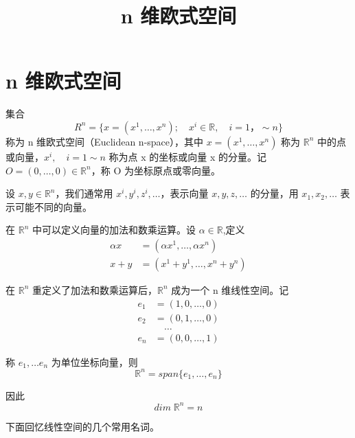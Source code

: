 \documentclass{article}
\title{n 维欧式空间}
\date{}
\author{}
\begin{document}
\maketitle

\section{n 维欧式空间}
集合
\begin{equation*}
    R^n = \{x =(x^1,\dots,x^n);\quad x^i \in \mathbb{R},\quad  i = 1， \sim n\}
\end{equation*}
称为 n 维欧式空间（Euclidean n-space），其中 \(x =(x^1,\dots ,x^n)\) 称为 \(\mathbb{R}^n\) 中的点或向量，\(x^i, \quad i = 1 \sim n\) 称为点 x 的坐标或向量 x 的分量。记 \(O =(0,\dots ,0)\in \mathbb{R}^n\)，称 O 为坐标原点或零向量。

\vspace{10pt}

设 \(x,y \in \mathbb{R}^n\)，我们通常用 \(x^i,y^i,z^i,\dots \)，表示向量 \(x,y,z,\dots \) 的分量，用 \(x_1,x_2,\dots \) 表示可能不同的向量。

\vspace{20pt}

在 \(\mathbb{R}^n\) 中可以定义向量的加法和数乘运算。设 \(\alpha \in \mathbb{R}\),定义
\begin{align*}
    \alpha x &= (\alpha x^1,\dots ,\alpha x^n) \\
    x + y &= (x^1 + y^1,\dots ,x^n + y^n)
\end{align*}

在 \(\mathbb{R}^n\) 重定义了加法和数乘运算后，\(\mathbb{R}^n\) 成为一个 n 维线性空间。记
\begin{align*}
    e_1 &= (1,0,\dots ,0) \\
    e_2 &= (0,1,\dots ,0) \\
    &\quad \dots \\
    e_n &= (0,0,\dots ,1)
\end{align*}

称 \(e_1,\dots e_n\) 为单位坐标向量，则
\begin{equation*}
    \mathbb{R}^n = span \{e_1,\dots ,e_n\}
\end{equation*}

因此
\begin{equation*}
    dim \;\mathbb{R}^n = n
\end{equation*}

\newpage

下面回忆线性空间的几个常用名词。
\end{document}
